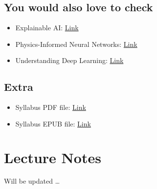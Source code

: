 \documentclass[
]{book}
\begin{document}
\hypertarget{you-would-also-love-to-check}{%
\section*{You would also love to check}\label{you-would-also-love-to-check}}

\begin{itemize}
\item
  Explainable AI: \href{https://youtube.com/playlist?list=PLV8yxwGOxvvovp-j6ztxhF3QcKXT6vORU\&si=7N_VPAK0OkqRGiIz}{Link}
\item
  Physics-Informed Neural Networks: \href{https://youtube.com/playlist?list=PLXmYoJbJ848pkMm9NGZZKXUQJ8XWIXZX8\&si=_AOgnC__wzOGc9xC}{Link}
\item
  Understanding Deep Learning: \href{https://github.com/udlbook/udlbook/tree/main}{Link}
\end{itemize}

\hypertarget{extra}{%
\section{Extra}\label{extra}}

\begin{itemize}
\item
  Syllabus PDF file: \href{https://github.com/NeuralIncendio/neuralIncendio.github.io/blob/main/docs/Intro2DeepLearning.pdf}{Link}
\item
  Syllabus EPUB file: \href{https://github.com/NeuralIncendio/neuralIncendio.github.io/blob/main/docs/Intro2DeepLearning.epub}{Link}
\end{itemize}

\hypertarget{Lecture_Notes}{%
\chapter{Lecture Notes}\label{Lecture_Notes}}

Will be updated \ldots{}

  
\end{document}

